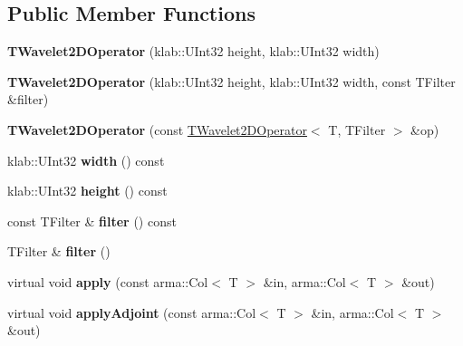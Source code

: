 \subsection*{Public Member Functions}
\begin{DoxyCompactItemize}
\item 
{\bfseries T\+Wavelet2\+D\+Operator} (klab\+::\+U\+Int32 height, klab\+::\+U\+Int32 width)\hypertarget{classkl1p_1_1TWavelet2DOperator_a805deaeb060cfbb9a2e3429e9a613895}{}\label{classkl1p_1_1TWavelet2DOperator_a805deaeb060cfbb9a2e3429e9a613895}

\item 
{\bfseries T\+Wavelet2\+D\+Operator} (klab\+::\+U\+Int32 height, klab\+::\+U\+Int32 width, const T\+Filter \&filter)\hypertarget{classkl1p_1_1TWavelet2DOperator_a45c1528808e9cfa316c4b1cf4bd58490}{}\label{classkl1p_1_1TWavelet2DOperator_a45c1528808e9cfa316c4b1cf4bd58490}

\item 
{\bfseries T\+Wavelet2\+D\+Operator} (const \hyperlink{classkl1p_1_1TWavelet2DOperator}{T\+Wavelet2\+D\+Operator}$<$ T, T\+Filter $>$ \&op)\hypertarget{classkl1p_1_1TWavelet2DOperator_a8a5b7a464f28df83d1a1efaf347ef6a8}{}\label{classkl1p_1_1TWavelet2DOperator_a8a5b7a464f28df83d1a1efaf347ef6a8}

\item 
klab\+::\+U\+Int32 {\bfseries width} () const \hypertarget{classkl1p_1_1TWavelet2DOperator_a318e4b5fceb84271821abf8e00a427a2}{}\label{classkl1p_1_1TWavelet2DOperator_a318e4b5fceb84271821abf8e00a427a2}

\item 
klab\+::\+U\+Int32 {\bfseries height} () const \hypertarget{classkl1p_1_1TWavelet2DOperator_a87c3ae7d47d26e78ec85379eb9b83d7b}{}\label{classkl1p_1_1TWavelet2DOperator_a87c3ae7d47d26e78ec85379eb9b83d7b}

\item 
const T\+Filter \& {\bfseries filter} () const \hypertarget{classkl1p_1_1TWavelet2DOperator_a79a04d650046b55213bb8d9d8de2e5c5}{}\label{classkl1p_1_1TWavelet2DOperator_a79a04d650046b55213bb8d9d8de2e5c5}

\item 
T\+Filter \& {\bfseries filter} ()\hypertarget{classkl1p_1_1TWavelet2DOperator_a2d291a85424de857dbdcccf45db92b1a}{}\label{classkl1p_1_1TWavelet2DOperator_a2d291a85424de857dbdcccf45db92b1a}

\item 
virtual void {\bfseries apply} (const arma\+::\+Col$<$ T $>$ \&in, arma\+::\+Col$<$ T $>$ \&out)\hypertarget{classkl1p_1_1TWavelet2DOperator_a12e1f8cd8deebb519d9acb90c5db84b5}{}\label{classkl1p_1_1TWavelet2DOperator_a12e1f8cd8deebb519d9acb90c5db84b5}

\item 
virtual void {\bfseries apply\+Adjoint} (const arma\+::\+Col$<$ T $>$ \&in, arma\+::\+Col$<$ T $>$ \&out)\hypertarget{classkl1p_1_1TWavelet2DOperator_a4d13676f6b9ea38a94acf9d9f0d8ae1e}{}\label{classkl1p_1_1TWavelet2DOperator_a4d13676f6b9ea38a94acf9d9f0d8ae1e}

\end{DoxyCompactItemize}
